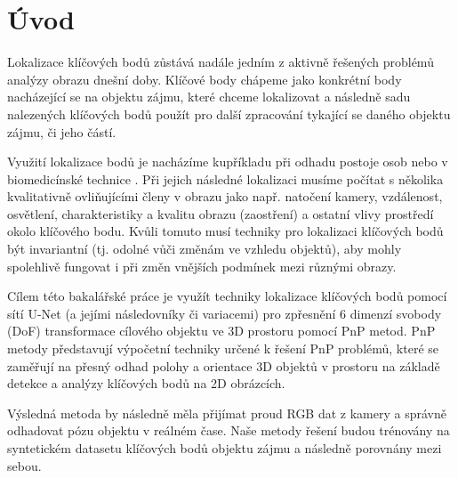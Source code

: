 \chapter{Úvod}
\label{sec:Introduction}
Lokalizace klíčových bodů zůstává nadále jedním z aktivně řešených problémů analýzy obrazu dnešní doby.
Klíčové body chápeme jako konkrétní body nacházející se na objektu zájmu, které chceme lokalizovat a následně sadu nalezených klíčových bodů použít pro další zpracování tykající se daného objektu zájmu, či jeho částí.

Využití lokalizace bodů je nacházíme kupříkladu při odhadu postoje osob \cite{humanpose} nebo v biomedicínské technice \cite{unet}.
Při jejich následné lokalizaci musíme počítat s několika kvalitativně ovliňujícími členy v obrazu jako např. natočení kamery, vzdálenost, osvětlení, charakteristiky a kvalitu obrazu (zaostření) a ostatní vlivy prostředí okolo klíčového bodu. Kvůli tomuto musí techniky pro lokalizaci klíčových bodů být invariantní (tj. odolné vůči změnám ve vzhledu objektů), aby mohly spolehlivě fungovat i při změn vnějších podmínek mezi různými obrazy.

Cílem této bakalářské práce je využít techniky lokalizace klíčových bodů pomocí sítí U-Net (a jejími následovníky či variacemi) pro zpřesnění 6 dimenzí svobody (DoF) transformace cílového objektu ve 3D prostoru pomocí PnP metod. PnP metody představují výpočetní techniky určené k řešení PnP problémů, které se zaměřují na přesný odhad polohy a orientace 3D objektů v prostoru na základě detekce a analýzy klíčových bodů na 2D obrázcích.

Výsledná metoda by následně měla přijímat proud RGB dat z kamery a správně odhadovat pózu objektu v reálném čase. Naše metody řešení budou trénovány na syntetickém datasetu klíčových bodů objektu zájmu a následně porovnány mezi sebou.
\endinput